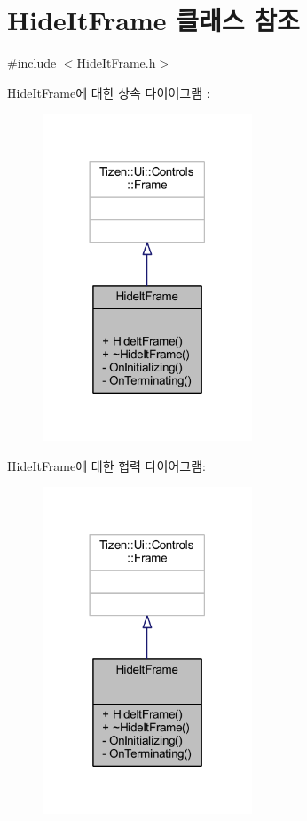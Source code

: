 \hypertarget{class_hide_it_frame}{\section{Hide\+It\+Frame 클래스 참조}
\label{class_hide_it_frame}
}


{\ttfamily \#include $<$Hide\+It\+Frame.\+h$>$}



Hide\+It\+Frame에 대한 상속 다이어그램 \+: 
\nopagebreak
\begin{figure}[H]
\begin{center}
\leavevmode
\includegraphics[width=177pt]{class_hide_it_frame__inherit__graph}
\end{center}
\end{figure}


Hide\+It\+Frame에 대한 협력 다이어그램\+:
\nopagebreak
\begin{figure}[H]
\begin{center}
\leavevmode
\includegraphics[width=177pt]{class_hide_it_frame__coll__graph}
\end{center}
\end{figure}
